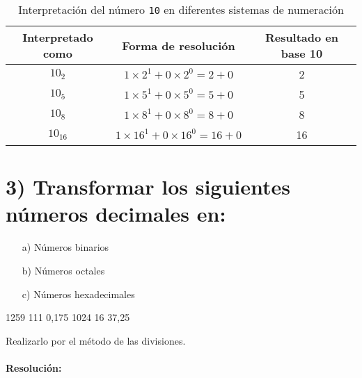 \documentclass[12pt]{article}
\begin{document}
\begin{table}[H]
	\centering
	\renewcommand{\arraystretch}{1.3}
	\begin{tabular}{|c|c|c|}
		\hline
		\textbf{Interpretado como} & \textbf{Forma de resolución} & \textbf{Resultado en base 10} \\
		\hline
		$10_2$  & $1 \times 2^1 + 0 \times 2^0 = 2 + 0$     & 2  \\
		\hline
		$10_5$  & $1 \times 5^1 + 0 \times 5^0 = 5 + 0$     & 5  \\
		\hline
		$10_8$  & $1 \times 8^1 + 0 \times 8^0 = 8 + 0$     & 8  \\
		\hline
		$10_{16}$ & $1 \times 16^1 + 0 \times 16^0 = 16 + 0$ & 16 \\
		\hline
	\end{tabular}
	\caption{Interpretación del número \texttt{10} en diferentes sistemas de numeración}
\end{table}

\section*{3) Transformar los siguientes números decimales en:}

	\begin{itemize}
		\item[a)] Números binarios
		\item[b)] Números octales
		\item[c)] Números hexadecimales
	\end{itemize}

	\vspace{0.5cm}

	 \hspace{1cm} 1259 \hspace{1cm} 111 \hspace{1cm} 0{,}175 \hspace{1cm} 1024 \hspace{1cm} 16 \hspace{1cm} 37{,}25

	\vspace{0.5cm}

	\noindent
	Realizarlo por el método de las divisiones.\\\\




\textbf{Resolución:} \\
\end{document}
